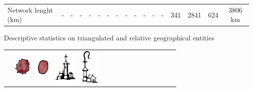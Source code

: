 \documentclass[portrait,a0]{sciposter}
\begin{document}
\begin{minipage}[b]{\textwidth}
\begin{multicols}{3}
\begin{center}
\begin{tabular}{l|cccccccc|c|ccccc|c|c}
        Network lenght (km)&-&-&-&-&-&-&-&-&-&-&-&-&\num{341}&\num{2841}&\num{624}&\num{3806} km 
      \end{tabular}
    \end{center}
    \vfill
    
    \footnotesize
    \begin{center}
      \captionsetup{type=table}
      \caption{Descriptive statistics on triangulated and relative geographical entities}\label{tab:symbols}
      \setcellgapes{1pt}
      \begin{tabular}{cccccccccccccccc}
        &
        \includegraphics[height=28pt]{gfx/ville_couleur.png}&
        \includegraphics[height=25pt]{gfx/bourg_couleur.png}&
        \includegraphics[height=40pt]{gfx/village.pdf}&
        \includegraphics[height=49pt]{gfx/abbaye.pdf}&

\end{tabular}
\end{center}
\end{multicols}
\end{minipage}
\end{document}
